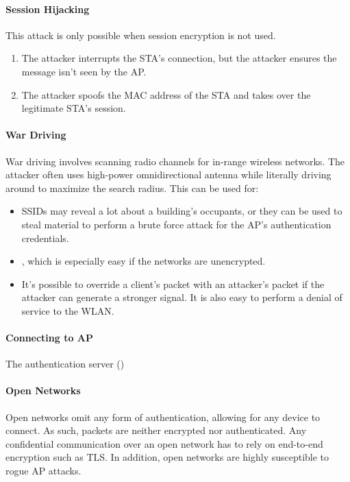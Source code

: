 \paragraph{Session Hijacking}
This attack is only possible when session encryption is not used.
\begin{enumerate}
    \item The attacker interrupts the STA's connection, but the attacker ensures the message isn't seen by the AP.
    \item The attacker spoofs the MAC address of the STA and takes over the legitimate STA's session.
\end{enumerate}

\paragraph{War Driving}
War driving involves scanning radio channels for in-range wireless networks. The attacker often uses high-power omnidirectional antenna while literally driving around to maximize the search radius. This can be used for:
\begin{itemize}
    \item {} SSIDs may reveal a lot about a building's occupants, or they can be used to steal material to perform a brute force attack for the AP's authentication credentials.
    \item {}, which is especially easy if the networks are unencrypted.
    \item {} It's possible to override a client's packet with an attacker's packet if the attacker can generate a stronger signal. It is also easy to perform a denial of service to the WLAN.
\end{itemize}

\paragraph{Connecting to AP}
The authentication server () 


\paragraph{Open Networks}
Open networks omit any form of authentication, allowing for any device to connect. As such, packets are neither encrypted nor authenticated. Any confidential communication over an open network has to rely on end-to-end encryption such as TLS. In addition, open networks are highly susceptible to rogue AP attacks.

